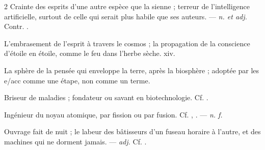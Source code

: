 \begin{multicols}{2}
 Crainte des esprits d'une autre espèce que la sienne ; terreur de l'intelligence artificielle, surtout de celle qui serait plus habile que ses auteurs. —  \textit{n. et adj.} Contr. .

 L'embrasement de l'esprit à travers le cosmos ; la propagation de la conscience d'étoile en étoile, comme le feu dans l'herbe sèche.   xiv.

 La sphère de la pensée qui enveloppe la terre, après la biosphère ; adoptée par les e/acc comme une étape, non comme un terme.

 Briseur de maladies ; fondateur ou savant en biotechnologie. Cf. .

 Ingénieur du noyau atomique, par fission ou par fusion. Cf. , . —  \textit{n. f.}

 Ouvrage fait de nuit ; le labeur des bâtisseurs d'un fuseau horaire à l'autre, et des machines qui ne dorment jamais. —  \textit{adj.} Cf. .

\end{multicols}

